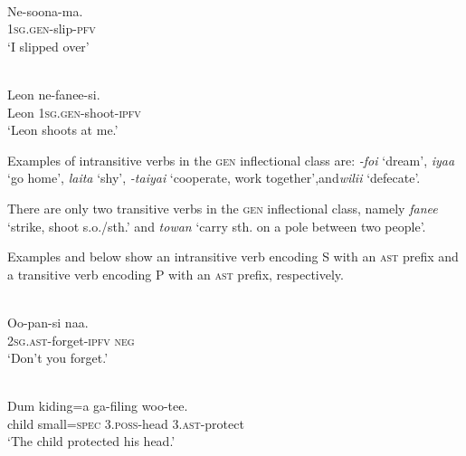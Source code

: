 \ea%
\label{bkm:Ref353451839}
 \\ 
\gll     Ne-soona-ma.  \\  
    1\textsc{sg.gen}{}-slip-\textsc{pfv}   \\
\glt  `I slipped over'
\z








\ea%
\label{bkm:Ref324339697}
 \\ 
\gll     Leon  ne-fanee-si.\\  
  Leon  1\textsc{sg}.\textsc{gen}{}-shoot-\textsc{ipfv}   \\
\glt  `Leon shoots at me.'
\z



 



Examples of intransitive verbs in the \textsc{gen} inflectional class are: \textit{{}-foi} `dream', \textit{iyaa} `go home', \textit{laita} `shy', \textit{{}-taiyai} `cooperate, work together',\textit{}and\textit{wilii} `defecate'.

  There are only two transitive verbs in the \textsc{gen} inflectional class, namely \textit{fanee} `strike, shoot s.o./sth.' and \textit{towan} `carry sth. on a pole between two people'.

Examples  and  below show an intransitive verb encoding S with an \textsc{ast} prefix and a transitive verb encoding P with an \textsc{ast} prefix, respectively.


\ea%
\label{bkm:Ref324340307}
 \\ 
\gll     Oo-pan-si  naa.\\  
    2\textsc{sg.ast}{}-forget-\textsc{ipfv} \textsc{neg}  \\
\glt  `Don't you forget.'
\z








\ea%
\label{bkm:Ref324340314}
 \\ 
\gll   Dum  kiding=a  ga-filing  woo-tee. \\  
  child  small=\textsc{spec} \textsc{3.poss}{}-head  3.\textsc{ast}{}-protect   \\
\glt  `The child protected his head.'
\z



